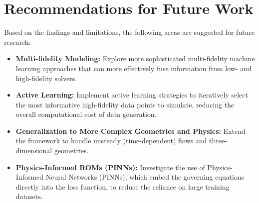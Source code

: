 \documentclass[dscexam, EN]{ufabcFHZh}
\begin{document}
\section{Recommendations for Future Work}
Based on the findings and limitations, the following areas are suggested for future research:
\begin{itemize}
    \item \textbf{Multi-fidelity Modeling:} Explore more sophisticated multi-fidelity machine learning approaches that can more effectively fuse information from low- and high-fidelity solvers.
    \item \textbf{Active Learning:} Implement active learning strategies to iteratively select the most informative high-fidelity data points to simulate, reducing the overall computational cost of data generation.
    \item \textbf{Generalization to More Complex Geometries and Physics:} Extend the framework to handle unsteady (time-dependent) flows and three-dimensional geometries.
    \item \textbf{Physics-Informed ROMs (PINNs):} Investigate the use of Physics-Informed Neural Networks (PINNs), which embed the governing equations directly into the loss function, to reduce the reliance on large training datasets.
\end{itemize}

\backmatter






\end{document}

